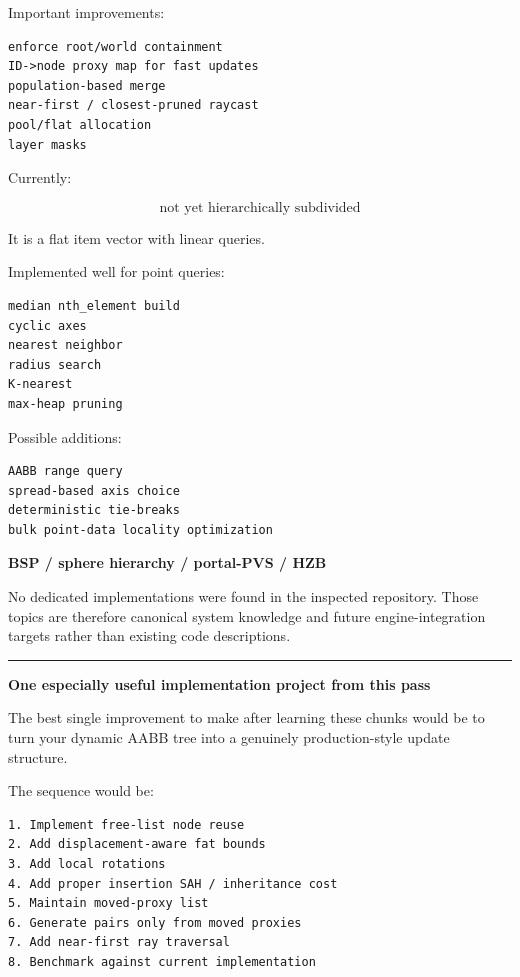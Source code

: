 Important improvements:

\begin{verbatim}
enforce root/world containment
ID->node proxy map for fast updates
population-based merge
near-first / closest-pruned raycast
pool/flat allocation
layer masks
\end{verbatim}

\textbf{}

Currently:

\[
\boxed{\text{not yet hierarchically subdivided}}
\]

It is a flat item vector with linear queries.

\textbf{}

Implemented well for point queries:

\begin{verbatim}
median nth_element build
cyclic axes
nearest neighbor
radius search
K-nearest
max-heap pruning
\end{verbatim}

Possible additions:

\begin{verbatim}
AABB range query
spread-based axis choice
deterministic tie-breaks
bulk point-data locality optimization
\end{verbatim}

\textbf{BSP / sphere hierarchy / portal-PVS / HZB}

No dedicated implementations were found in the inspected  repository. Those topics are therefore canonical system knowledge and future engine-integration targets rather than existing code descriptions.

\begin{center}\rule{0.5\linewidth}{0.5pt}\end{center}

\textbf{One especially useful implementation project from this pass}

The best single improvement to make after learning these chunks would be to turn your dynamic AABB tree into a genuinely production-style update structure.

The sequence would be:

\begin{verbatim}
1. Implement free-list node reuse
2. Add displacement-aware fat bounds
3. Add local rotations
4. Add proper insertion SAH / inheritance cost
5. Maintain moved-proxy list
6. Generate pairs only from moved proxies
7. Add near-first ray traversal
8. Benchmark against current implementation
\end{verbatim}

